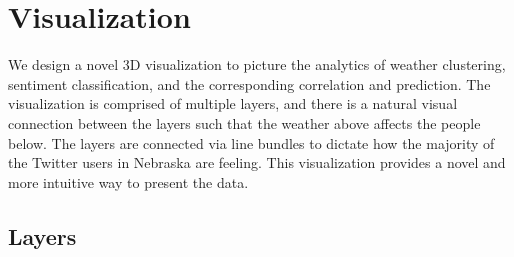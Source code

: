 %
%
%




\section{Visualization}
\label{sec:vis}

We design a novel 3D visualization to picture the analytics of weather clustering, sentiment classification, and the corresponding correlation and prediction. The visualization is comprised of multiple layers, and there is a natural visual connection between the layers such that the weather above affects the people below.
The layers are connected via line bundles to dictate how the majority of the Twitter users in Nebraska are feeling. This visualization provides a novel and more intuitive way to present the data.

\subsection{Layers}


